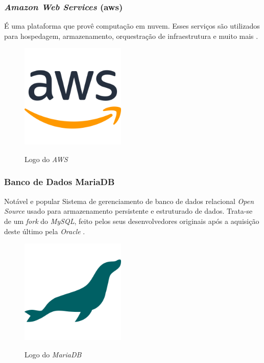 \subsubsection{\emph{Amazon Web Services} (\gls{aws})} 
É uma plataforma que provê computação em nuvem. Esses serviços são utilizados para hospedagem, armazenamento, orquestração de infraestrutura e muito mais \cite{aws}.

\begin{figure}[htb]
	\centering
	\caption{Logo do \emph{AWS}}
	\includegraphics[width=5cm]{cap04-desenvolvimento/images/4-4-3-2-aws-logo.png}
	\label{fig:aws-logo}
\end{figure}
\FloatBarrier

\subsubsection{Banco de Dados MariaDB}
Notável e popular Sistema de gerenciamento de banco de dados relacional \emph{Open Source} usado para armazenamento persistente e estruturado de dados. Trata-se de um \emph{fork} do \emph{MySQL}, feito pelos seus desenvolvedores originais após a aquisição deste último pela \emph{Oracle} \cite{mariadb}.

\begin{figure}[htb]
	\centering
	\caption{Logo do \emph{MariaDB}}
	\includegraphics[width=5cm]{cap04-desenvolvimento/images/4-4-3-3-mariadb-logo.png}
	\label{fig:mariadb-logo}
\end{figure}
\FloatBarrier

